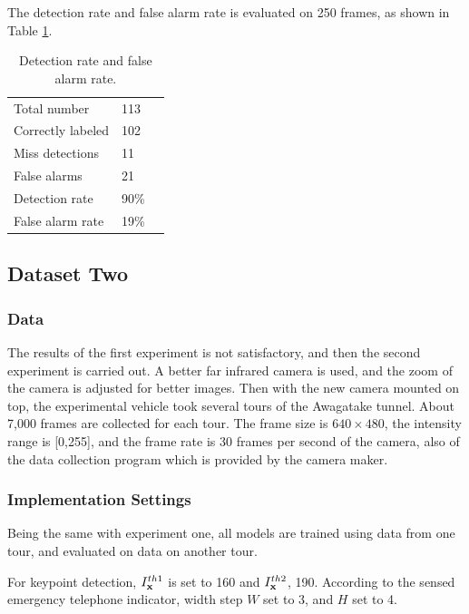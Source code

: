 The detection rate and false alarm rate is evaluated on 250 frames, as shown in Table \ref{ex1:tb2}.

\begin{table}[h]
\centering
\begin{tabular}{lll}
     \hline
     \hline
    Total number &	113   \\
    Correctly labeled &	102   \\
    Miss detections &	11 &	  \\
    False alarms &	21    \\
    Detection rate &	90\% &	  \\
    False alarm rate &	19\% &	   \\
   \hline
\end{tabular}
\caption[Detection rate and false alarm rate]{Detection rate and false alarm rate.}\label{ex1:tb2}
\end{table}

\subsection{Dataset Two}



\subsubsection{Data} The results of the first experiment is not satisfactory, and then the second experiment is carried out. A better far infrared camera is used, and the zoom of the camera is adjusted for better images. Then with the new camera mounted on top, the experimental vehicle took several tours of the Awagatake tunnel. About 7,000 frames are collected for each tour. The frame size is $640\times 480$, the intensity range is [0,255], and the frame rate is 30 frames per second of the camera, also of the data collection program which is provided by the camera maker.

\subsubsection{Implementation Settings} Being the same with experiment one, all models are trained using data from one tour, and evaluated on data on another tour.

 For keypoint detection, $I^{th1}_{\bf{x}}$ is set to 160 and $I^{th2}_{\bf{x}}$, 190. According to the sensed emergency telephone indicator, width step $W$ set to 3, and $H$ set to 4.

